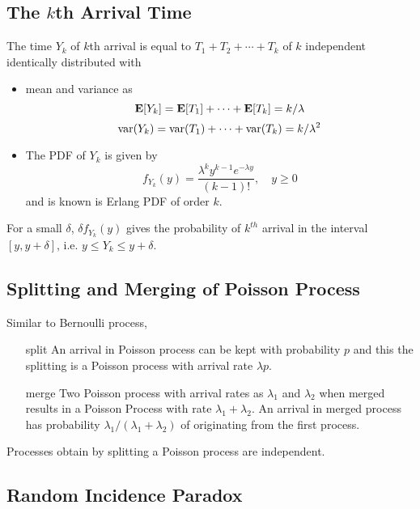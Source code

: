 \subsection{The $k$th Arrival Time}
The time $Y_k$ of $k$th arrival is equal to $T_1+T_2+\cdots+T_k$ of $k$ independent identically distributed \rv with 
\begin{itemize}
    \item mean and variance as
    \[\operatorname{\textbf{E}}[Y_k]=\operatorname{\textbf{E}}[T_1]+\cdots+\operatorname{\textbf{E}}[T_k]= k/\lambda\]
    \[ \operatorname{\text{var}}(Y_k)=\operatorname{\text{var}}(T_1)+\cdots+\operatorname{\text{var}}(T_k)=k/\lambda^2\]
    \item The PDF of $Y_k$ is given by
    \[f_{Y_k}(y)=\frac{\lambda^ky^{k-1}e^{-\lambda y}}{(k-1)!}, \quad y\ge 0\]
    and is known is Erlang PDF of order $k$.
\end{itemize}

\begin{remark}
    For a small $\delta$, $\delta f_{Y_k}(y)$ gives the probability of $k^{th}$ arrival in the interval $[y,y+\delta]$, i.e. $y\le Y_k \le y+\delta$.
\end{remark}

\subsection{Splitting and Merging of Poisson Process}
Similar to Bernoulli process, 
\begin{enumerate}
    \item [split] An arrival in Poisson process can be kept with probability $p$ and this the splitting is a Poisson process with arrival rate $\lambda p$.
    \item [merge] Two Poisson process with arrival rates as $\lambda_1$ and $\lambda_2$ when merged results in a Poisson Process with rate $\lambda_1 + \lambda_2$. An arrival in merged process has probability $\lambda_1/(\lambda_1+\lambda_2)$ of originating from the first process.
\end{enumerate}
\begin{remark}
    Processes obtain by splitting a Poisson process are independent.
\end{remark}

\subsection{Random Incidence Paradox}

